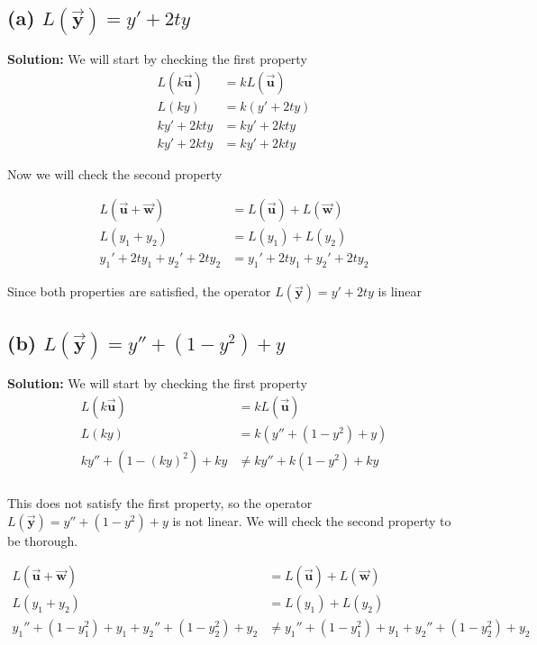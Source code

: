 \documentclass[12pt, letterpaper]{article}
\begin{document}
\subsection*{(a) $L(\vec{\textbf{y}}) = y' + 2ty$}
\textbf{Solution:} We will start by checking the first property
\begin{align*}
    L(k\vec{\textbf{u}}) &= kL(\vec{\textbf{u}}) \\
    L(ky) &= k(y' + 2ty) \\
    ky' + 2kty &= ky' + 2kty \\
    ky' + 2kty &= ky' + 2kty
\end{align*}

Now we will check the second property

\begin{align*}
    L(\vec{\textbf{u}} + \vec{\textbf{w}}) &= L(\vec{\textbf{u}}) + L(\vec{\textbf{w}}) \\
    L(y_1 + y_2) &= L(y_1) + L(y_2) \\
    y_1' + 2ty_1 + y_2' + 2ty_2 &= y_1' + 2ty_1 + y_2' + 2ty_2
\end{align*}

Since both properties are satisfied, the operator $L(\vec{\textbf{y}}) = y' + 2ty$ is linear

\subsection*{(b) $L(\vec{\textbf{y}}) = y'' + (1-y^2) + y$}
\textbf{Solution:} We will start by checking the first property
\begin{align*}
    L(k\vec{\textbf{u}}) &= kL(\vec{\textbf{u}}) \\
    L(ky) &= k(y'' + (1-y^2) + y) \\
    ky'' + (1-(ky)^2) + ky &\neq ky'' + k(1-y^2) + ky \\
\end{align*}

This does not satisfy the first property, so the operator $L(\vec{\textbf{y}}) = y'' + (1-y^2) + y$ is not linear. We will check the second property to be thorough.

\begin{align*}
    L(\vec{\textbf{u}} + \vec{\textbf{w}}) &= L(\vec{\textbf{u}}) + L(\vec{\textbf{w}}) \\
    L(y_1 + y_2) &= L(y_1) + L(y_2) \\
    y_1'' + (1-y_1^2) + y_1 + y_2'' + (1-y_2^2) + y_2 &\neq y_1'' + (1-y_1^2) + y_1 + y_2'' + (1-y_2^2) + y_2
\end{align*}
\end{document}
